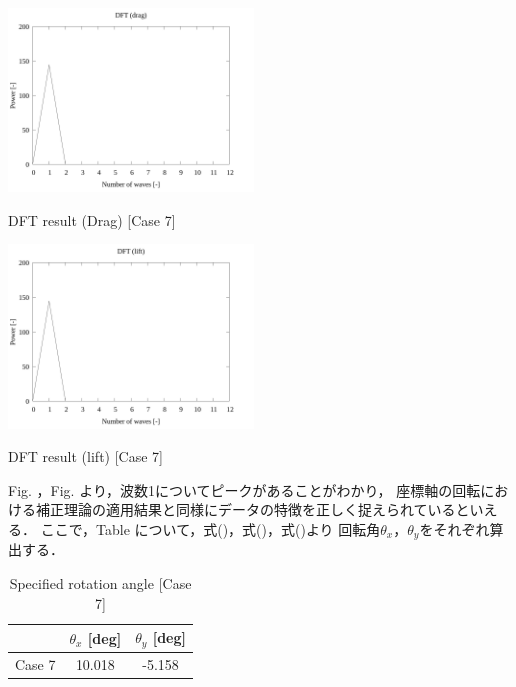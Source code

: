 \newpage

\begin{multicols}{2}
    \begin{figure_here}
        \begin{center}
            \includegraphics[width=65mm]{../../02_workspace/result/simulation_tx=10.0_ty=-5.0_dx=5.00_dy=-2.50/plot/07/07-3_dft-drag.png}
            \caption{DFT result (Drag) [Case 7]}
            \includegraphics[width=65mm]{../../02_workspace/result/simulation_tx=10.0_ty=-5.0_dx=5.00_dy=-2.50/plot/07/07-4_dft-lift.png}
            \caption{DFT result (lift) [Case 7]}
        \end{center}
    \end{figure_here}
\end{multicols}

Fig. ，Fig. より，波数1についてピークがあることがわかり，
座標軸の回転における補正理論の適用結果と同様にデータの特徴を正しく捉えられているといえる．
ここで，Table について，式()，式()，式()より
回転角$\theta_x$，$\theta_y$をそれぞれ算出する．

\begin{table}[htbp]
    \begin{center}
        \caption{Specified rotation angle [Case 7]}
        \begin{tabular}{|p{30mm}|p{20mm}|p{20mm}|}
            \hline
            \multicolumn{1}{|c|}{}       & \multicolumn{1}{|c|}{$\theta_x$ [deg]} & \multicolumn{1}{|c|}{$\theta_y$ [deg]} \\ \hline
            \multicolumn{1}{|c|}{Case 7} & \multicolumn{1}{|c|}{10.018}           & \multicolumn{1}{|c|}{-5.158}           \\ \hline
        \end{tabular}
    \end{center}
\end{table}


